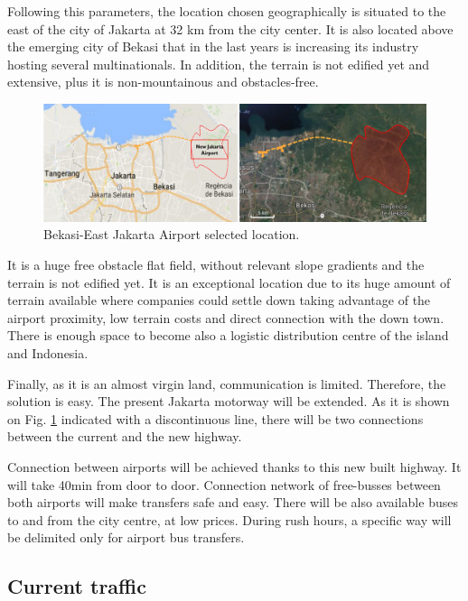 Following this parameters, the location chosen geographically is situated to the east of the city of Jakarta at 32 km from the city center. It is also located above the emerging city of Bekasi that in the last years is increasing its industry hosting several multinationals. In addition, the terrain is not edified yet and extensive, plus it is non-mountainous and obstacles-free.

\begin{figure}[H]
	\centering
	\includegraphics[clip, trim=0cm 0cm 0cm 0cm, width=1\textwidth]{./images/PROGNOSIS/airport_location}
	\caption{Bekasi-East Jakarta Airport selected location.}
	\label{airprt-location}
\end{figure}

It is a huge free obstacle flat field, without relevant slope gradients and the terrain is not edified yet. It is an exceptional location due to its huge amount of terrain available where companies could settle down taking advantage of the airport proximity, low terrain costs and direct connection with the down town. There is enough space to become also a logistic distribution centre of the island and Indonesia.

Finally, as it is an almost virgin land, communication is limited. Therefore, the solution is easy. The present Jakarta motorway will be extended. As it is shown on Fig. \ref{airprt-location} indicated with a discontinuous line, there will be two connections between the current and the new highway. 

Connection between airports will be achieved thanks to this new built highway. It will take 40min from door to door. Connection network of free-busses between both airports will make transfers safe and easy. There will be also available buses to and from the city centre, at low prices. During rush hours, a specific way will be delimited only for airport bus transfers. 

	
	\subsection{Current traffic}
